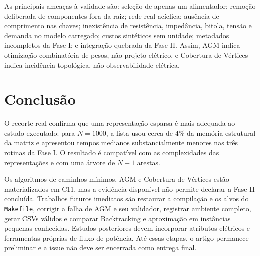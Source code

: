 \documentclass[12pt]{article}
\begin{document}
As principais ameaças à validade são: seleção de apenas um alimentador; remoção deliberada de componentes fora da raiz; rede real acíclica; ausência de comprimento nas chaves; inexistência de resistência, impedância, bitola, tensão e demanda no modelo carregado; custos sintéticos sem unidade; metadados incompletos da Fase I; e integração quebrada da Fase II. Assim, AGM indica otimização combinatória de pesos, não projeto elétrico, e Cobertura de Vértices indica incidência topológica, não observabilidade elétrica.

\section{Conclusão}

O recorte real confirma que uma representação esparsa é mais adequada ao estudo executado: para $N=1000$, a lista usou cerca de 4\% da memória estrutural da matriz e apresentou tempos medianos substancialmente menores nas três rotinas da Fase I. O resultado é compatível com as complexidades das representações e com uma árvore de $N-1$ arestas.

Os algoritmos de caminhos mínimos, AGM e Cobertura de Vértices estão materializados em C11, mas a evidência disponível não permite declarar a Fase II concluída. Trabalhos futuros imediatos são restaurar a compilação e os alvos do \texttt{Makefile}, corrigir a falha de AGM e seu validador, registrar ambiente completo, gerar CSVs válidos e comparar Backtracking e aproximação em instâncias pequenas conhecidas. Estudos posteriores devem incorporar atributos elétricos e ferramentas próprias de fluxo de potência. Até essas etapas, o artigo permanece preliminar e a issue não deve ser encerrada como entrega final.



\end{document}
